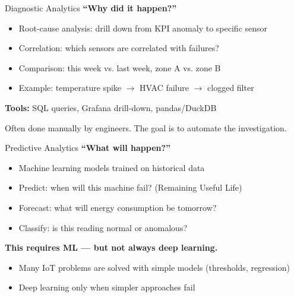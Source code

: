\documentclass[aspectratio=169,11pt]{beamer}
\begin{document}
\begin{frame}{Diagnostic Analytics}
    \textbf{``Why did it happen?''}
    \begin{itemize}
        \item Root-cause analysis: drill down from KPI anomaly to specific sensor
        \item Correlation: which sensors are correlated with failures?
        \item Comparison: this week vs. last week, zone A vs. zone B
        \item Example: temperature spike $\rightarrow$ HVAC failure $\rightarrow$ clogged filter
    \end{itemize}

    \vspace{0.3cm}
    \textbf{Tools:} SQL queries, Grafana drill-down, pandas/DuckDB

    \vspace{0.3cm}
    \begin{block}{}
        Often done manually by engineers. The goal is to automate the investigation.
    \end{block}
\end{frame}

\begin{frame}{Predictive Analytics}
    \textbf{``What will happen?''}
    \begin{itemize}
        \item Machine learning models trained on historical data
        \item Predict: when will this machine fail? (Remaining Useful Life)
        \item Forecast: what will energy consumption be tomorrow?
        \item Classify: is this reading normal or anomalous?
    \end{itemize}

    \vspace{0.3cm}
    \textbf{This requires ML --- but not always deep learning.}
    \begin{itemize}
        \item Many IoT problems are solved with simple models (thresholds, regression)
        \item Deep learning only when simpler approaches fail
    \end{itemize}
\end{frame}
\end{document}
